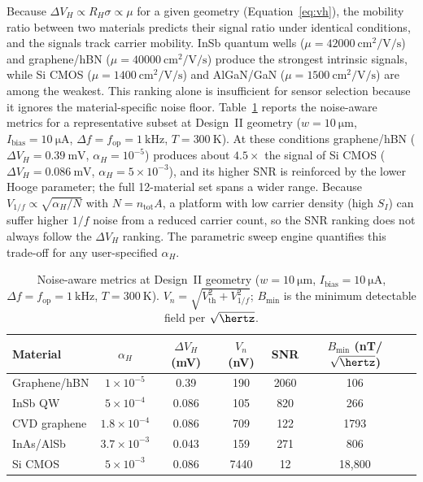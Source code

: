 \documentclass[biosensors,article,submit,pdftex,moreauthors]{Definitions/mdpi}
\begin{document}
Because $\Delta V_H \propto R_H \sigma \propto \mu$ for a given geometry
(Equation~\eqref{eq:vh}), the mobility ratio between two materials predicts their
signal ratio under identical conditions, and the signals track carrier mobility. InSb
quantum wells ($\mu = \SI{42000}{\centi\meter\squared\per\volt\per\second}$) and
graphene/hBN ($\mu = \SI{40000}{\centi\meter\squared\per\volt\per\second}$) produce
the strongest intrinsic signals, while Si CMOS
($\mu = \SI{1400}{\centi\meter\squared\per\volt\per\second}$) and AlGaN/GaN
($\mu = \SI{1500}{\centi\meter\squared\per\volt\per\second}$) are among the weakest.
This ranking alone is insufficient for sensor selection because it ignores the
material-specific noise floor. Table~\ref{tab:noise} reports the noise-aware metrics
for a representative subset at Design~II geometry ($w = \SI{10}{\micro\meter}$,
$I_\text{bias} = \SI{10}{\micro\ampere}$, $\Delta f = f_\text{op} = \SI{1}{\kilo\hertz}$,
$T = \SI{300}{\kelvin}$). At these conditions graphene/hBN
($\Delta V_H = \SI{0.39}{\milli\volt}$, $\alpha_H = 10^{-5}$) produces about
$4.5\times$ the signal of Si CMOS ($\Delta V_H = \SI{0.086}{\milli\volt}$,
$\alpha_H = 5\times10^{-3}$), and its higher SNR is reinforced by the lower Hooge
parameter; the full 12-material set spans a wider range. Because
$V_{1/f} \propto \sqrt{\alpha_H / N}$ with $N = n_\text{tot} A$, a platform with low
carrier density (high $S_I$) can suffer higher $1/f$ noise from a reduced carrier
count, so the SNR ranking does not always follow the $\Delta V_H$ ranking. The
parametric sweep engine quantifies this trade-off for any user-specified $\alpha_H$.

\begin{table}[H]
\caption{Noise-aware metrics at Design~II geometry
($w = \SI{10}{\micro\meter}$, $I_\text{bias} = \SI{10}{\micro\ampere}$,
$\Delta f = f_\text{op} = \SI{1}{\kilo\hertz}$, $T = \SI{300}{\kelvin}$).
$V_n = \sqrt{V_\text{th}^2 + V_{1/f}^2}$;
$B_\text{min}$ is the minimum detectable field per $\sqrt{\hertz}$.\label{tab:noise}}
\begin{tabularx}{\textwidth}{Xcccccc}
\toprule
\textbf{Material} & \boldmath$\alpha_H$ &
\textbf{\boldmath$\Delta V_H$ (mV)} & \textbf{\boldmath$V_n$ (nV)} &
\textbf{SNR} & \textbf{\boldmath$B_\text{min}$ (nT/$\sqrt{\hertz}$)} \\
\midrule
Graphene/hBN  & $1\times10^{-5}$   & 0.39  & 190   & 2060 & 106 \\
InSb QW       & $5\times10^{-4}$   & 0.086 & 105   & 820  & 266 \\
CVD graphene  & $1.8\times10^{-4}$ & 0.086 & 709   & 122  & 1793 \\
InAs/AlSb     & $3.7\times10^{-3}$ & 0.043 & 159   & 271  & 806 \\
Si CMOS       & $5\times10^{-3}$   & 0.086 & 7440  & 12   & 18{,}800 \\
\bottomrule
\end{tabularx}
\end{table}
\end{document}

